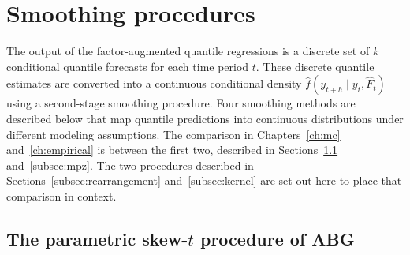 \documentclass[12pt]{report} %
\begin{document}
\section{Smoothing procedures}
\label{sec:smoothing}

The output of the factor-augmented quantile regressions is a discrete set of $k$ conditional quantile forecasts for each time period $t$. These discrete quantile estimates are converted into a continuous conditional density $\hat{f}(y_{t+h} \mid y_t, \hat{F}_t)$ using a second-stage smoothing procedure. Four smoothing methods are described below that map quantile predictions into continuous distributions under different modeling assumptions. The comparison in Chapters~\ref{ch:mc} and~\ref{ch:empirical} is between the first two, described in Sections~\ref{subsec:skewt} and~\ref{subsec:mpz}. The two procedures described in Sections~\ref{subsec:rearrangement} and~\ref{subsec:kernel} are set out here to place that comparison in context.

\subsection{The parametric \texorpdfstring{skew-$t$}{skew-t} procedure of ABG}
\label{subsec:skewt}
\end{document}
